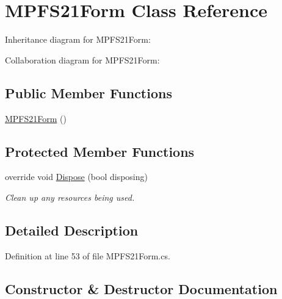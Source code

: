 \hypertarget{class_m_p_f_s21_1_1_m_p_f_s21_form}{}\section{M\+P\+F\+S21\+Form Class Reference}
\label{class_m_p_f_s21_1_1_m_p_f_s21_form}


Inheritance diagram for M\+P\+F\+S21\+Form\+:


Collaboration diagram for M\+P\+F\+S21\+Form\+:
\subsection*{Public Member Functions}
\begin{DoxyCompactItemize}
\item 
\hyperlink{class_m_p_f_s21_1_1_m_p_f_s21_form_a8e126eb6bbb8dd3554cb214f80e60857}{M\+P\+F\+S21\+Form} ()
\end{DoxyCompactItemize}
\subsection*{Protected Member Functions}
\begin{DoxyCompactItemize}
\item 
override void \hyperlink{class_m_p_f_s21_1_1_m_p_f_s21_form_a849c3c7f8d08104f0cdb46bee9fe6389}{Dispose} (bool disposing)
\begin{DoxyCompactList}\small\item\em Clean up any resources being used. \end{DoxyCompactList}\end{DoxyCompactItemize}


\subsection{Detailed Description}


Definition at line 53 of file M\+P\+F\+S21\+Form.\+cs.



\subsection{Constructor \& Destructor Documentation}
\hypertarget{class_m_p_f_s21_1_1_m_p_f_s21_form_a8e126eb6bbb8dd3554cb214f80e60857}{}
